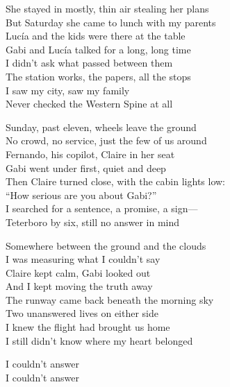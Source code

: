 \begin{lyrics}
She stayed in mostly, thin air stealing her plans\\
But Saturday she came to lunch with my parents\\
Lucía and the kids were there at the table\\
Gabi and Lucía talked for a long, long time\\
I didn’t ask what passed between them\\
The station works, the papers, all the stops\\
I saw my city, saw my family\\
Never checked the Western Spine at all

Sunday, past eleven, wheels leave the ground\\
No crowd, no service, just the few of us around\\
Fernando, his copilot, Claire in her seat\\
Gabi went under first, quiet and deep\\
Then Claire turned close, with the cabin lights low:\\
“How serious are you about Gabi?”\\
I searched for a sentence, a promise, a sign—\\
Teterboro by six, still no answer in mind

Somewhere between the ground and the clouds\\
I was measuring what I couldn’t say\\
Claire kept calm, Gabi looked out\\
And I kept moving the truth away\\
The runway came back beneath the morning sky\\
Two unanswered lives on either side\\
I knew the flight had brought us home\\
I still didn’t know where my heart belonged

I couldn’t answer\\
I couldn’t answer
\end{lyrics}

